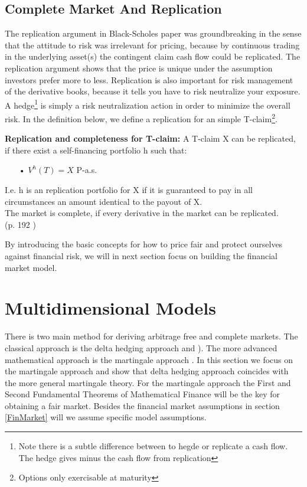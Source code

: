 \subsection{Complete Market And Replication}
The replication argument in Black-Scholes paper \parencite{B-S-Paper} was groundbreaking in the sense that the attitude to risk was irrelevant for pricing, because by continuous trading in the underlying asset(s) the contingent claim cash flow could be replicated. The replication argument shows that the price is unique under the assumption investors prefer more to less. Replication is also important for risk management of the derivative books, because it tells you have to risk neutralize your exposure. A hedge\footnote{Note there is a subtle difference between to hegde or replicate a cash flow. The hedge gives minus the cash flow from replication} is simply a risk neutralization action in order to minimize the overall risk. In the definition below, we define a replication for an simple T-claim\footnote{Options only exercisable at maturity}.
\theoremstyle{definition}
\begin{definition}{\textbf{Replication and completeness for T-claim: }}
A T-claim X can be replicated, if there exist a self-financing portfolio h such that:
\begin{enumerate}
\item[•] $V^{h}(T)=X$ P-a.s.
\end{enumerate}
I.e. h is an replication portfolio for X if it is guaranteed to pay in all circumstances an amount identical to the payout of X.\\
The market is complete, if every derivative in the market can be replicated.\\
\null \hfill (p. 192 \parencite{finKont})
\end{definition}

By introducing the basic concepts for how to price fair and protect ourselves against financial risk, we will in next section focus on building the financial market model.


\section{Multidimensional Models}\label{MultiDimModel}
There is two main method for deriving arbitrage free and complete markets. The classical approach is the delta hedging approach \parencite{B-S-Paper} and \parencite{CRR}). The more advanced mathematical approach is the martingale approach  \parencite{finKont}. In this section we focus on the martingale approach and show that delta hedging approach coincides with the more general martingale theory. For the martingale approach the First and Second Fundamental Theorems of Mathematical Finance will be the key for obtaining a fair market. Besides the financial market assumptions in section \ref{FinMarket} will we assume specific model assumptions.

